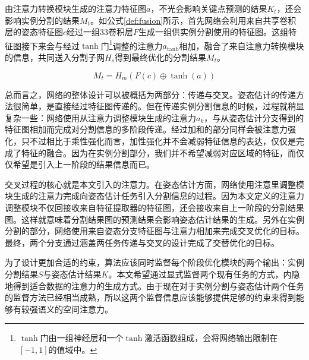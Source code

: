 由注意力转换模块生成的注意力特征图$a$，不光会影响关键点预测的结果$K_t$，还会影响实例分割的结果$M_t$。如公式\eqref{def:fusion}所示，首先网络会利用来自共享卷积层的姿态特征图$c$经过一组3\times3卷积层$F$生成一组供实例分割使用的特征图。这组特征图接下来会与经过$\tanh$门\footnote{$\tanh$门由一组神经层和一个$\tanh$激活函数组成，会将网络输出限制在$[-1, 1]$的值域中。}调整的注意力$a_{\tanh}$相加，融合了来自注意力转换模块的信息，共同送入分割子网$H_s$得到最终优化的分割结果$M_t$。

\begin{equation}
\label{def:fusion}
M_t = H_m(F(c) \oplus \tanh(a))
\end{equation}

总而言之，网络的整体设计可以被概括为两部分：传递与交叉。姿态估计的传递方法很简单，是直接经过特征图传递的。但在传递实例分割信息的时候，过程就稍显复杂一些：网络使用从注意力调整模块生成的注意力$a_k$，与从姿态估计分支得到的特征图相加而完成对分割信息的多阶段传递。经过加和的部分同样会被注意力强化，只不过相比于乘性强化而言，加性强化并不会减弱特征信息的表达，仅仅是完成了特征的融合。因为在实例分割部分，我们并不希望减弱对应区域的特征，而仅仅希望是引入上一阶段的结果信息而已。

交叉过程的核心就是本文引入的注意力。在姿态估计方面，网络使用注意里调整模块生成的注意力完成向姿态估计任务引入分割信息的过程。因为本文定义的注意力调整模块不仅回接收来自特征提取器的特征图，还会接收来自上一阶段的分割结果图。这样就意味着分割结果图的预测结果会影响姿态估计结果的生成。另外在实例分割的部分，网络使用来自姿态分支特征图与注意力相加来完成交叉优化的目标。最终，两个分支通过涵盖两任务传递与交叉的设计完成了交替优化的目标。

为了设计更加合适的约束，算法应该同时监督每个阶段优化模块的两个输出：实例分割结果$S$与姿态估计结果$K$。本文希望通过显式监督两个现有任务的方式，内隐地得到适合数据的注意力的生成方式。由于现在对于实例分割与姿态估计两个任务的监督方法已经相当成熟，所以这两个监督信息应该能够提供足够的约束来得到能够有较强语义的空间注意力。

